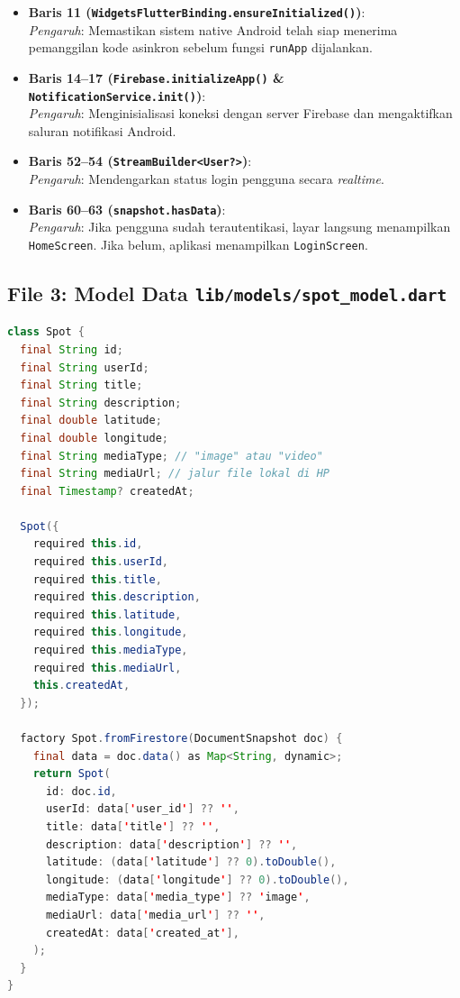 \documentclass[12pt,a4paper]{article}
\begin{document}
\begin{highlightbox}
\begin{itemize}[leftmargin=*]
    \item \textbf{Baris 11 (\texttt{WidgetsFlutterBinding.ensureInitialized()})}:\\
    \textit{Pengaruh}: Memastikan sistem native Android telah siap menerima pemanggilan kode asinkron sebelum fungsi \texttt{runApp} dijalankan.
    \item \textbf{Baris 14--17 (\texttt{Firebase.initializeApp()} \& \texttt{NotificationService.init()})}:\\
    \textit{Pengaruh}: Menginisialisasi koneksi dengan server Firebase dan mengaktifkan saluran notifikasi Android.
    \item \textbf{Baris 52--54 (\texttt{StreamBuilder<User?>})}:\\
    \textit{Pengaruh}: Mendengarkan status login pengguna secara \textit{realtime}.
    \item \textbf{Baris 60--63 (\texttt{snapshot.hasData})}:\\
    \textit{Pengaruh}: Jika pengguna sudah terautentikasi, layar langsung menampilkan \texttt{HomeScreen}. Jika belum, aplikasi menampilkan \texttt{LoginScreen}.
\end{itemize}
\end{highlightbox}

\newpage
\subsection{File 3: Model Data \texttt{lib/models/spot\_model.dart}}

\begin{lstlisting}[language=Java, firstnumber=3, caption=lib/models/spot\_model.dart]
class Spot {
  final String id;
  final String userId;
  final String title;
  final String description;
  final double latitude;
  final double longitude;
  final String mediaType; // "image" atau "video"
  final String mediaUrl; // jalur file lokal di HP
  final Timestamp? createdAt;

  Spot({
    required this.id,
    required this.userId,
    required this.title,
    required this.description,
    required this.latitude,
    required this.longitude,
    required this.mediaType,
    required this.mediaUrl,
    this.createdAt,
  });

  factory Spot.fromFirestore(DocumentSnapshot doc) {
    final data = doc.data() as Map<String, dynamic>;
    return Spot(
      id: doc.id,
      userId: data['user_id'] ?? '',
      title: data['title'] ?? '',
      description: data['description'] ?? '',
      latitude: (data['latitude'] ?? 0).toDouble(),
      longitude: (data['longitude'] ?? 0).toDouble(),
      mediaType: data['media_type'] ?? 'image',
      mediaUrl: data['media_url'] ?? '',
      createdAt: data['created_at'],
    );
  }
}
\end{lstlisting}
\end{document}
